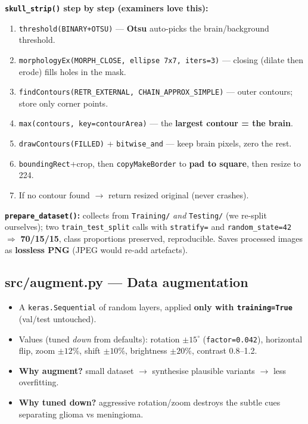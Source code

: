 \documentclass[11pt,a4paper]{article}
\newcommand{\code}[1]{\colorbox{codebg}{\small\texttt{#1}}}
\begin{document}
\begin{keybox}
\textbf{\code{skull\_strip()} step by step (examiners love this):}
\begin{enumerate}[leftmargin=*,itemsep=1pt]
  \item \code{threshold(BINARY+OTSU)} --- \textbf{Otsu} auto-picks the brain/background threshold.
  \item \code{morphologyEx(MORPH\_CLOSE, ellipse 7x7, iters=3)} --- closing (dilate then erode) fills holes in the mask.
  \item \code{findContours(RETR\_EXTERNAL, CHAIN\_APPROX\_SIMPLE)} --- outer contours; store only corner points.
  \item \code{max(contours, key=contourArea)} --- the \textbf{largest contour = the brain}.
  \item \code{drawContours(FILLED)} + \code{bitwise\_and} --- keep brain pixels, zero the rest.
  \item \code{boundingRect}+crop, then \code{copyMakeBorder} to \textbf{pad to square}, then resize to 224.
  \item If no contour found $\rightarrow$ return resized original (never crashes).
\end{enumerate}
\end{keybox}

\noindent\textbf{\code{prepare\_dataset()}:} collects from \code{Training/} \emph{and} \code{Testing/} (we re-split ourselves); two
\code{train\_test\_split} calls with \code{stratify=} and \code{random\_state=42} $\Rightarrow$ \textbf{70/15/15}, class
proportions preserved, reproducible. Saves processed images as \textbf{lossless PNG} (JPEG would re-add artefacts).

\subsection{src/augment.py --- Data augmentation}
\begin{itemize}[leftmargin=*,itemsep=1pt]
  \item A \code{keras.Sequential} of random layers, applied \textbf{only with \code{training=True}} (val/test untouched).
  \item Values (tuned \emph{down} from defaults): rotation $\pm15^\circ$ (\code{factor=0.042}), horizontal flip, zoom $\pm12\%$, shift $\pm10\%$, brightness $\pm20\%$, contrast 0.8--1.2.
  \item \textbf{Why augment?} small dataset $\rightarrow$ synthesise plausible variants $\rightarrow$ less overfitting.
  \item \textbf{Why tuned down?} aggressive rotation/zoom destroys the subtle cues separating glioma vs meningioma.
\end{itemize}
\end{document}

